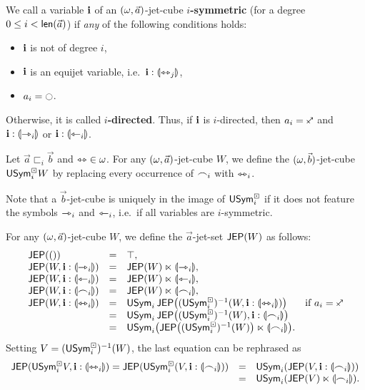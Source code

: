 \documentclass[a4paper]{memoir}
\begin{document}
\begin{definition} \label{def:symmetric-var}
	We call a variable $\mathbf{i}$ of an $(\omega, \vec a)$-jet-cube \textbf{$i$-symmetric} (for a degree $0 \leq i < \mathsf{len}(\vec a)$) if \emph{any} of the following conditions holds:
	\begin{itemize}
		\item $\mathbf{i}$ is not of degree $i$,
		\item $\mathbf{i}$ is an equijet variable, i.e.\ $\mathbf{i} : {\llparenthesis \leftrightarrowtriangle_j \rrparenthesis}$,
		\item $a_i = \npolar$.
	\end{itemize}
	Otherwise, it is called \textbf{$i$-directed}.
	Thus, if $\mathbf{i}$ is $i$-directed, then $a_i = \ypolar$ and $\mathbf{i} : {\llparenthesis \rightarrowtriangle_i \rrparenthesis}$ or $\mathbf{i} : {\llparenthesis \leftarrowtriangle_i \rrparenthesis}$.
\end{definition}
\begin{definition} \label{def:sym-forget-cube}
	Let $\vec a \sqsubset_i \vec b$ and ${\leftrightarrowtriangle} \in \omega$. For any $(\omega, \vec a)$-jet-cube $W$, we define the $(\omega, \vec b)$-jet-cube $\mathsf{USym}^\boxdot_i W$ by replacing every occurrence of $\frown_i$ with $\leftrightarrowtriangle_i$.
\end{definition}
Note that a $\vec b$-jet-cube is uniquely in the image of $\mathsf{USym}^\boxdot_i$ if it does not feature the symbols $\rightarrowtriangle_i$ and $\leftarrowtriangle_i$, i.e.\ if all variables are $i$-symmetric.
\begin{definition} \label{def:jep}
	For any $(\omega, \vec a)$-jet-cube $W$, we define the $\vec a$-jet-set $\mathsf{JEP}(W)$ as follows:
	\[ \begin{array}{l c l l}
		\JEP(()) &=& \top, \\
		\JEP(W, \dm i : \rival{\jet_i}) &=& \JEP(W) \multip \rival{\jet_i}, \\
		\JEP(W, \dm i : \rival{\tej_i}) &=& \JEP(W) \multip \rival{\tej_i}, \\
		\JEP(W, \dm i : \rival{\edge_i}) &=& \JEP(W) \multip \rival{\edge_i}, \\
		\JEP(W, \dm i : \rival{\equijet_i}) &=& \Usym_i \, \JEP\paren{(\Usymcube_i)\inv(W, \dm i : \rival{\equijet_i})}
		& \text{if $a_i = \ypolar$} \\
		&=& \Usym_i \, \JEP\paren{(\Usymcube_i)\inv(W), \dm i : \rival{\edge_i}} \\
		&=& \Usym_i\paren{\JEP\paren{(\Usymcube_i)\inv(W)} \multip \rival{\edge_i}}.
	\end{array} \]
	Setting $V = (\mathsf{USym}^\boxdot_i)^{-1}(W)$, the last equation can be rephrased as
	\[ \begin{array}{l c l l}
		\mathsf{JEP}(\mathsf{USym}^\boxdot_i V, \mathbf{i} : {\llparenthesis \leftrightarrowtriangle_i \rrparenthesis})
		= \mathsf{JEP}(\mathsf{USym}^\boxdot_i(V, \mathbf{i} : {\llparenthesis \frown_i \rrparenthesis}))
		&=& \mathsf{USym}_i(\mathsf{JEP}(V, \mathbf{i} : {\llparenthesis \frown_i \rrparenthesis})) \\
		&=& \mathsf{USym}_i(\mathsf{JEP}(V) \ltimes {\llparenthesis \frown_i \rrparenthesis}).
	\end{array} \]
\end{definition}
\end{document}
